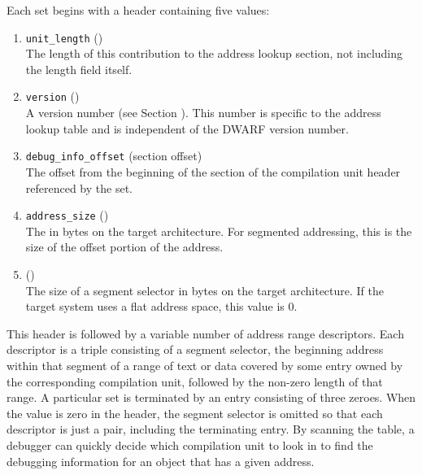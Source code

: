 Each set begins with a header containing five values:
\begin{enumerate}[1. ]
\item \texttt{unit\_length} () \\
The length of this contribution to the address lookup section,
not including the length field itself.

\item \texttt{version} (\HFTuhalf) \\
A version number
(see Section ). 
This number is specific to the address lookup table and is
independent of the DWARF version number.

\item \texttt{debug\_info\_offset} (section offset) \\
The offset from the
beginning of the \dotdebuginfo{} section of the
compilation unit header referenced by the set.

\item \texttt{address\_size} (\HFTubyte) \\
The 
in bytes on
the target architecture. For 
segmented addressing, this is
the size of the offset portion of the address.

\item \HFNsegmentselectorsize{} (\HFTubyte) \\
The size of a segment selector in
bytes on the target architecture. If the target system uses
a flat address space, this value is 0.

\end{enumerate}

This header is followed by a variable number of address range
descriptors. Each descriptor is a triple consisting of a
segment selector, the beginning address within that segment
of a range of text or data covered by some entry owned by
the corresponding compilation unit, followed by the non-zero
length of that range. A particular set is terminated by an
entry consisting of three zeroes. 
When the \HFNsegmentselectorsize{} value
is zero in the header, the segment selector is omitted so that
each descriptor is just a pair, including the terminating
entry. By scanning the table, a debugger can quickly decide
which compilation unit to look in to find the debugging
information for an object that has a given address.

